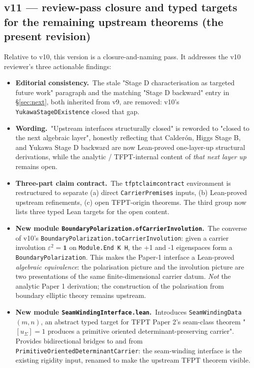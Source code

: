 \subsection*{v11 --- review-pass closure and typed targets for
the remaining upstream theorems (the present revision)}

Relative to v10, this version is a closure-and-naming pass. It
addresses the v10 reviewer's three actionable findings:

\begin{itemize}[leftmargin=1.6em, itemsep=2pt]
\item \textbf{Editorial consistency.}\ The stale "Stage D
    characterisation as targeted future work" paragraph and the
    matching "Stage D backward" entry in \S\ref{sec:next}, both
    inherited from v9, are removed: v10's
    \texttt{YukawaStageDExistence} closed that gap.

\item \textbf{Wording.}\ "Upstream interfaces structurally
    closed" is reworded to "closed to the next algebraic
    layer", honestly reflecting that Calder\'on, Higgs Stage B,
    and Yukawa Stage D backward are now Lean-proved
    one-layer-up structural derivations, while the analytic
    / TFPT-internal content of \emph{that next layer up}
    remains open.

\item \textbf{Three-part claim contract.}\ The
    \texttt{tfptclaimcontract} environment is restructured to
    separate (a) direct \texttt{CarrierPremises} inputs,
    (b) Lean-proved upstream refinements, (c) open
    TFPT-origin theorems. The third group now lists three
    typed Lean targets for the open content.

\item \textbf{New module
    \texttt{BoundaryPolarization.ofCarrierInvolution}.}\
    The converse of v10's
    \texttt{BoundaryPolarization.toCarrierInvolution}: given
    a carrier involution $\varepsilon^2 = \mathbf 1$ on
    \texttt{Module.End K H}, the +1 and -1 eigenspaces form a
    \texttt{BoundaryPolarization}. This makes the Paper-1
    interface a Lean-proved \emph{algebraic equivalence}: the
    polarisation picture and the involution picture are two
    presentations of the same finite-dimensional carrier
    datum. \emph{Not} the analytic Paper 1 derivation; the
    construction of the polarisation from boundary elliptic
    theory remains upstream.

\item \textbf{New module \texttt{SeamWindingInterface.lean}.}\
    Introduces \texttt{SeamWindingData}\,$(m, n)$, an abstract
    typed target for TFPT Paper 2's seam-class theorem
    "$[u_\Sigma] = 1$ produces a primitive oriented
    determinant-preserving carrier". Provides bidirectional
    bridges to and from \texttt{PrimitiveOrientedDeterminantCarrier}:
    the seam-winding interface is the existing rigidity input,
    renamed to make the upstream TFPT theorem visible.


\end{itemize}
